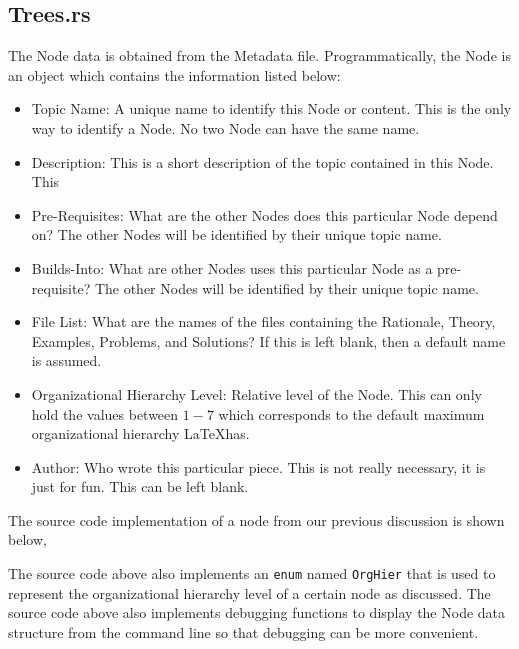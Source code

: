 \documentclass[a4paper, 12pt]{report}
\begin{document}
\begin{center}
\subsection{Trees.rs}
\begin{comment}
\end{comment}
The Node data is obtained from the Metadata file. Programmatically, the Node is an object which contains the information listed below:
\begin{itemize}
\item Topic Name: A unique name to identify this Node or content. This is the only way to identify a Node. No two Node can have the same name.
\item Description: This is a short description of the topic contained in this Node. This 
\item Pre-Requisites: What are the other Nodes does this particular Node depend on? The other Nodes will be identified by their unique topic name.
\item Builds-Into: What are other Nodes uses this particular Node as a pre-requisite? The other Nodes will be identified by their unique topic name.
\item File List: What are the names of the files containing the Rationale, Theory, Examples, Problems, and Solutions? If this is left blank, then a default name is assumed.
\item Organizational Hierarchy Level: Relative level of the Node. This can only hold the values between $1-7$ which corresponds to the default maximum organizational hierarchy \LaTeX has.
\item Author: Who wrote this particular piece. This is not really necessary, it is just for fun. This can be left blank.
\end{itemize}
The source code implementation of a node from our previous discussion is shown below,

The source code above also implements an \texttt{enum} named \texttt{OrgHier} that is used to represent the organizational hierarchy level of a certain node as discussed.
The source code above also implements debugging functions to display the Node data structure from the command line so that debugging can be more convenient.


\end{center}
\end{document}
